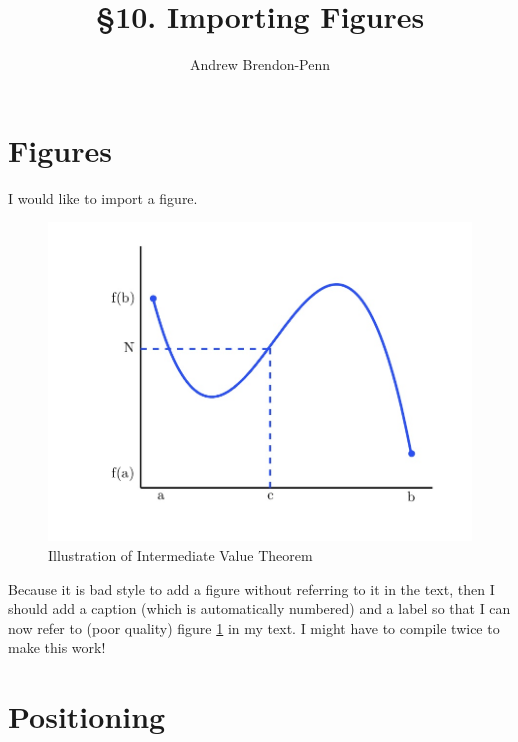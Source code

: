 \documentclass[a4paper,11pt]{article}
\title{\S10. Importing Figures}
\author{Andrew Brendon-Penn}
\begin{document}
\maketitle

\section{Figures}

I would like to import a figure.

\begin{figure}[hbtp]
	\centering %
	\includegraphics[width=5in]{IVT.jpg} %
	\caption{Illustration of Intermediate Value Theorem}
	\label{fig:IVT}  %
\end{figure}
%
Because it is bad style to add a figure without referring to it in the text, then I should add a caption (which is automatically numbered) and a label so that I can now  refer to (poor quality) figure \ref{fig:IVT} in my text. I might have to compile twice to make this work!

\pagebreak

\section{Positioning}
\end{document}
